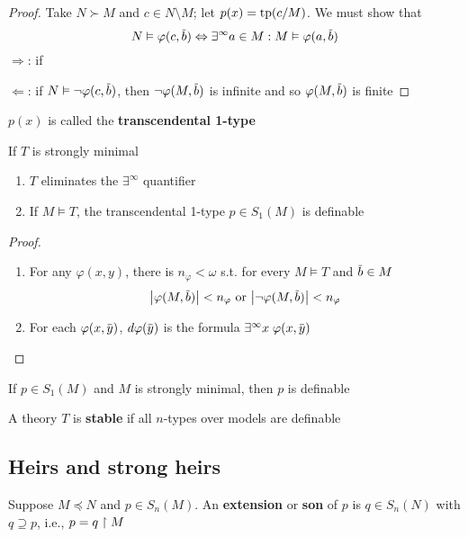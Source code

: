 \documentclass[11pt]{article}
\begin{document}
\begin{proof}
Take \(N\succ M\) and \(c\in N\setminus M\); let \(p(x)=\operatorname{tp}(c/M)\). We must show that
\begin{equation*}
N\vDash\varphi(c,\barb)\Leftrightarrow\exists^{\infty}a\in M:M\vDash\varphi(a,\barb)
\end{equation*}
\(\Rightarrow\): if

\(\Leftarrow\): if \(N\vDash\neg\varphi(c,\barb)\), then \(\neg\varphi(M,\barb)\) is infinite and so \(\varphi(M,\barb)\) is finite
\end{proof}

\(p(x)\) is called the \textbf{transcendental 1-type}

\begin{proposition}[]
If \(T\) is strongly minimal
\begin{enumerate}
\item \(T\) eliminates the \(\exists^\infty\) quantifier
\item If \(M\vDash T\), the transcendental 1-type \(p\in S_1(M)\) is definable
\end{enumerate}
\end{proposition}

\begin{proof}
\begin{enumerate}
\item For any \(\varphi(x,y)\), there is \(n_\varphi<\omega\) s.t. for every \(M\vDash T\) and \(\barb\in M\)
\begin{equation*}
\abs{\varphi(M,\barb)}<n_\varphi\text{ or }\abs{\neg\varphi(M,\barb)}<n_\varphi
\end{equation*}
\item For each \(\varphi(x,\bary)\), \(d\varphi(\bary)\) is the formula \(\exists^\infty x\;\varphi(x,\bary)\)
\end{enumerate}
\end{proof}

\begin{corollary}[]
If \(p\in S_1(M)\) and \(M\) is strongly minimal, then \(p\) is definable
\end{corollary}

\begin{definition}[]
A theory \(T\) is \textbf{stable} if all \(n\)-types over models are definable
\end{definition}
\subsection{Heirs and strong heirs}
\label{sec:orgeae955b}
Suppose \(M\preceq N\) and \(p\in S_n(M)\). An \textbf{extension} or \textbf{son} of \(p\) is \(q\in S_n(N)\)
with \(q\supseteq p\), i.e., \(p=q\upharpoonright M\)
\end{document}
